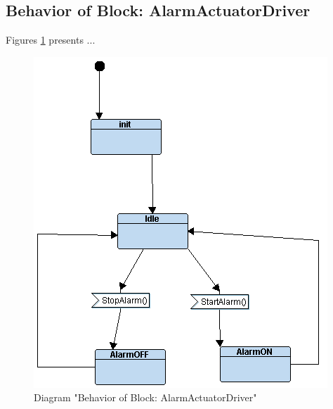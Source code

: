 \subsection{Behavior of Block: AlarmActuatorDriver}
Figures \ref{fig:AlarmActuatorDriverAlarmActuatorDriver25} presents ...
\begin{figure}[htb]
\centering
\includegraphics[width=\textwidth]{img_2_5.png}
\caption{Diagram "Behavior of Block: AlarmActuatorDriver"}
\label{fig:AlarmActuatorDriverAlarmActuatorDriver25}
\end{figure}

